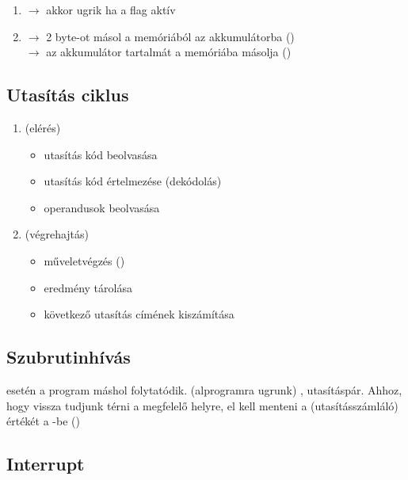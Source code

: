 \documentclass[../main.tex]{subfiles}
\begin{document}
\begin{itemize}
\begin{enumerate}
          \item {} $\rightarrow$
                akkor ugrik ha a  flag aktív

          \item {} $\rightarrow$
                2 byte-ot másol a memóriából az akkumulátorba
                ()
                \\
                 $\rightarrow$
                az akkumulátor tartalmát a memóriába másolja
                ()
        \end{enumerate}
\end{itemize}

\subsection{Utasítás ciklus}

\begin{enumerate}
  \item {} (elérés)
        \begin{itemize}
          \item utasítás kód beolvasása
          \item utasítás kód értelmezése (dekódolás)
          \item operandusok beolvasása
        \end{itemize}
  \item {} (végrehajtás)
        \begin{itemize}
          \item műveletvégzés ()
          \item eredmény tárolása
          \item következő utasítás címének kiszámítása
        \end{itemize}
\end{enumerate}

\subsection{Szubrutinhívás}

 esetén a program máshol folytatódik. (alprogramra ugrunk)
,  utasításpár. Ahhoz, hogy vissza tudjunk térni a megfelelő
helyre, el kell menteni a  (utasításszámláló) értékét a -be
()

\subsection{Interrupt}
\end{document}
